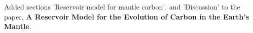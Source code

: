 Added sections 'Reservoir model for mantle carbon', and 'Discussion' to the paper, \textbf{A Reservoir Model for the Evolution of Carbon in the Earth's Mantle}.
